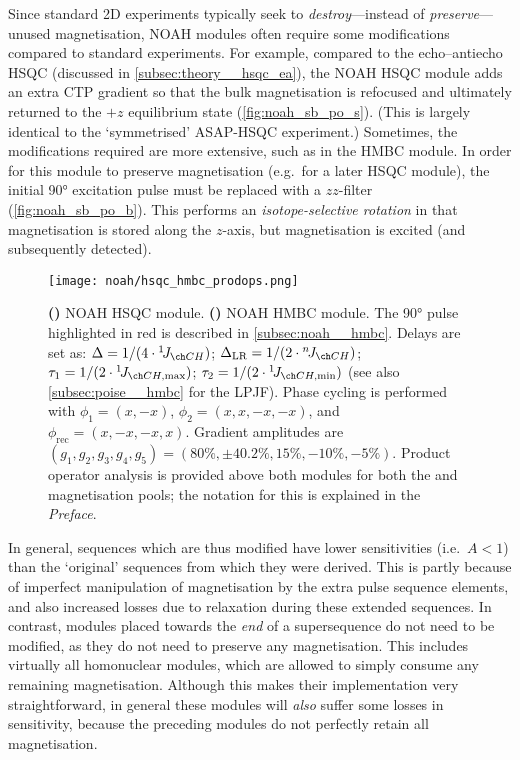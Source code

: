 Since standard 2D experiments typically seek to \textit{destroy}---instead of \textit{preserve}---unused magnetisation, NOAH modules often require some modifications compared to standard experiments.
For example, compared to the echo--antiecho HSQC (discussed in \cref{subsec:theory__hsqc_ea}), the NOAH HSQC module\autocite{Kupce2017ACIE} adds an extra CTP gradient so that the bulk magnetisation is refocused and ultimately returned to the $+z$ equilibrium state (\cref{fig:noah_sb_po_s}).
(This is largely identical to the `symmetrised' ASAP-HSQC experiment\autocite{SchulzeSunninghausen2017JMR}.)
Sometimes, the modifications required are more extensive, such as in the HMBC module.
In order for this module to preserve  magnetisation (e.g.\ for a later HSQC module), the initial \ang{90} excitation pulse must be replaced with a $zz$-filter (\cref{fig:noah_sb_po_b}).
This performs an \textit{isotope-selective rotation} in that  magnetisation is stored along the $z$-axis, but  magnetisation is excited (and subsequently detected).

\begin{figure}[htb]
    \centering
    \texttt{[image: noah/hsqc\_hmbc\_prodops.png]}%
    {\label{fig:noah_sb_po_s}}%
    {\label{fig:noah_sb_po_b}}%
    \caption[NOAH HSQC and HMBC modules with product operator analysis]{
        \textbf{()} 
        NOAH HSQC module.
        \textbf{()} 
        NOAH HMBC module.
        The \ang{90} pulse highlighted in red is described in \cref{subsec:noah__hmbc}.
        Delays are set as: $\Delta = 1 / (4 \cdot \oneJ{CH})$; $\Delta_\text{LR} = 1 / (2 \cdot \nJ{CH})$; $\tau_1 = 1 / (2 \cdot \oneJ{CH,\text{max}})$; $\tau_2 = 1 / (2 \cdot \oneJ{CH,\text{min}})$ (see also \cref{subsec:poise__hmbc} for the LPJF).
        Phase cycling is performed with $\phi_1 = (x, -x)$, $\phi_2 = (x, x, -x, -x)$, and $\phi_\text{rec} = (x, -x, -x, x)$.
        Gradient amplitudes are $(g_1, g_2, g_3, g_4, g_5) = (80\%, \pm 40.2\%, 15\%, -10\%, -5\%)$.
        Product operator analysis is provided above both modules for both the  and  magnetisation pools; the notation for this is explained in the \textit{Preface}.
    }
    \label{fig:noah_sb_po}
\end{figure}

In general, sequences which are thus modified have lower sensitivities (i.e.\ $A < 1$) than the `original' sequences from which they were derived.
This is partly because of imperfect manipulation of magnetisation by the extra pulse sequence elements, and also increased losses due to relaxation during these extended sequences.
In contrast, modules placed towards the \textit{end} of a supersequence do not need to be modified, as they do not need to preserve any magnetisation.
This includes virtually all homonuclear modules, which are allowed to simply consume any remaining magnetisation.
Although this makes their implementation very straightforward, in general these modules will \textit{also} suffer some losses in sensitivity, because the preceding modules do not perfectly retain all magnetisation.

